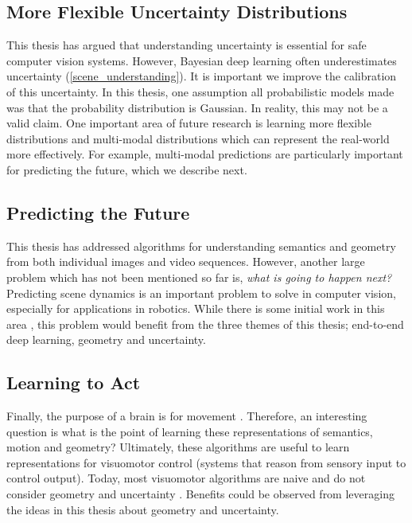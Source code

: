 \subsection{More Flexible Uncertainty Distributions}
This thesis has argued that understanding uncertainty is essential for safe computer vision systems. However, Bayesian deep learning often underestimates uncertainty (\cref{scene_understanding}). It is important we improve the calibration of this uncertainty. In this thesis, one assumption all probabilistic models made was that the probability distribution is Gaussian. In reality, this may not be a valid claim. One important area of future research is learning more flexible distributions and multi-modal distributions which can represent the real-world more effectively. For example, multi-modal predictions are particularly important for predicting the future, which we describe next.

\subsection{Predicting the Future}
This thesis has addressed algorithms for understanding semantics and geometry from both individual images and video sequences. However, another large problem which has not been mentioned so far is, \textit{what is going to happen next?} Predicting scene dynamics is an important problem to solve in computer vision, especially for applications in robotics. While there is some initial work in this area \citep{luc2017predicting}, this problem would benefit from the three themes of this thesis; end-to-end deep learning, geometry and uncertainty.

\subsection{Learning to Act}
Finally, the purpose of a brain is for movement \citep{wolpert2000computational}. Therefore, an interesting question is what is the point of learning these representations of semantics, motion and geometry? Ultimately, these algorithms are useful to learn representations for visuomotor control (systems that reason from sensory input to control output). Today, most visuomotor algorithms are naive and do not consider geometry and uncertainty \citep{levine2016end}. Benefits could be observed from leveraging the ideas in this thesis about geometry and uncertainty.
